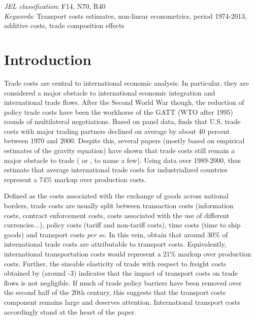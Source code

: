 \documentclass[a4paper,11pt]{article}
\begin{document}
\thispagestyle{empty} \pagestyle{plain} \setcounter{page}{1}

\bigskip


\noindent \emph{JEL classification}: F14, N70, R40 \\
\noindent \emph{Keywords}: Transport costs estimates, non-linear econometrics, period 1974-2013, additive costs, trade composition effects

{\normalsize \vspace{0cm} }

{\normalsize \titlepage }

{\normalsize \newpage }


\section{Introduction \label{sec:Intro}}

Trade costs are central to international economic analysis. In particular, they are considered a major obstacle to international economic integration and international trade flows. After the Second World War though, the reduction of policy trade costs have been the workhorse of the GATT (WTO after 1995) rounds of multilateral negotiations. Based on panel data, \citet{novy13} finds  that U.S. trade costs with major trading partners declined on average by about 40 percent between 1970 and 2000. Despite this, several papers (mostly based on empirical estimates of the gravity equation) have shown that trade costs still remain a major obstacle to trade (\cite{Head_Mayer04} or \cite{Disdier_Head08}, to name a few). Using data over 1989-2000, \citet{anderson_wincoop_jel} thus estimate that average international trade costs for industrialized countries represent a 74\% markup over production costs.


Defined as the costs associated with the exchange of goods across national borders, trade costs are usually split between transaction costs (information costs, contract enforcement costs, costs associated with the use of different currencies...), policy costs (tariff  and non-tariff costs), time costs (time to ship goods) and transport costs \emph{per se}. In this vein, \citet{anderson_wincoop_jel} obtain that around 30\% of international trade costs are attributable to transport costs. Equivalently, international transportation costs would represent a 21\% markup over production costs. Further, the sizeable elasticity of trade with respect to freight costs obtained by \cite{Behar_Venables} (around -3) indicates that the impact of transport costs on trade flows is not negligible. If much of trade policy barriers have been removed over the second half of the 20th century, this suggests that the transport costs component remains large and deserves attention. International transport costs accordingly stand at the heart of the paper.\smallskip
\end{document}
